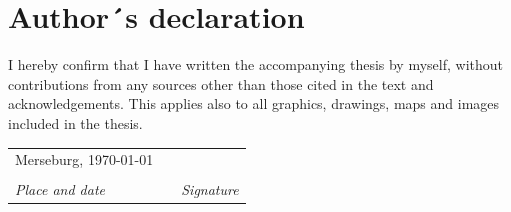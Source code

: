 %

\clearpage
{}


\nocite{*}


\begin{flushleft}
\newpage{}
\par\end{flushleft}

%

\vspace{17.1mm}


\section*{{\huge{}Author´s declaration}}

I hereby confirm that I have written the accompanying thesis by myself, without contributions from any sources other than those cited in the text and acknowledgements.
This applies also to all graphics, drawings, maps and images included in the thesis.

\vspace{2cm}

\begin{center}
	\begin{tabular}{@{}p{5cm}@{}p{2cm}@{}p{5cm}}%
		Merseburg, \today & &  \\
		\dotfill & & \dotfill \\
		\emph{Place and date} & & \emph{Signature} \\
	\end{tabular}
	\par
\end{center}

